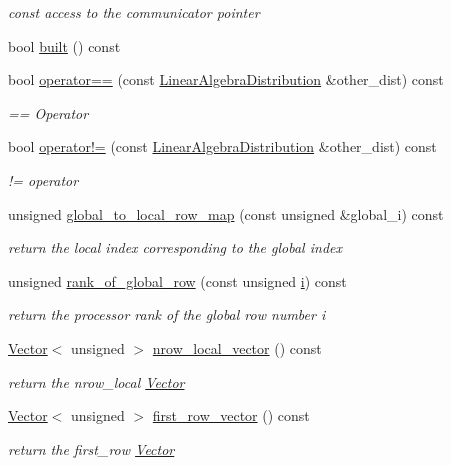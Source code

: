 \begin{DoxyCompactItemize}
\begin{DoxyCompactList}\small\item\em const access to the communicator pointer \end{DoxyCompactList}\item 
bool \hyperlink{classoomph_1_1LinearAlgebraDistribution_a92bfff97fd228b9c528922c39ab563b2}{built} () const
\item 
bool \hyperlink{classoomph_1_1LinearAlgebraDistribution_a2b38cf76c6636227fb3144812250a7e8}{operator==} (const \hyperlink{classoomph_1_1LinearAlgebraDistribution}{Linear\+Algebra\+Distribution} \&other\+\_\+dist) const
\begin{DoxyCompactList}\small\item\em == Operator \end{DoxyCompactList}\item 
bool \hyperlink{classoomph_1_1LinearAlgebraDistribution_a40765b8fee6c000dbe5b94c38d76466e}{operator!=} (const \hyperlink{classoomph_1_1LinearAlgebraDistribution}{Linear\+Algebra\+Distribution} \&other\+\_\+dist) const
\begin{DoxyCompactList}\small\item\em != operator \end{DoxyCompactList}\item 
unsigned \hyperlink{classoomph_1_1LinearAlgebraDistribution_a899aa7ebf7b1aab1fae2fccfc5b3b43d}{global\+\_\+to\+\_\+local\+\_\+row\+\_\+map} (const unsigned \&global\+\_\+i) const
\begin{DoxyCompactList}\small\item\em return the local index corresponding to the global index \end{DoxyCompactList}\item 
unsigned \hyperlink{classoomph_1_1LinearAlgebraDistribution_acd5ffc5ff4b91a8e63677f9677cd0039}{rank\+\_\+of\+\_\+global\+\_\+row} (const unsigned \hyperlink{cfortran_8h_adb50e893b86b3e55e751a42eab3cba82}{i}) const
\begin{DoxyCompactList}\small\item\em return the processor rank of the global row number i \end{DoxyCompactList}\item 
\hyperlink{classoomph_1_1Vector}{Vector}$<$ unsigned $>$ \hyperlink{classoomph_1_1LinearAlgebraDistribution_a8d8bc283c4b70295bafe1f5bacebbe64}{nrow\+\_\+local\+\_\+vector} () const
\begin{DoxyCompactList}\small\item\em return the nrow\+\_\+local \hyperlink{classoomph_1_1Vector}{Vector} \end{DoxyCompactList}\item 
\hyperlink{classoomph_1_1Vector}{Vector}$<$ unsigned $>$ \hyperlink{classoomph_1_1LinearAlgebraDistribution_a0d5b29bcfad98c3aa803dd8dab873ca9}{first\+\_\+row\+\_\+vector} () const
\begin{DoxyCompactList}\small\item\em return the first\+\_\+row \hyperlink{classoomph_1_1Vector}{Vector} \end{DoxyCompactList}\end{DoxyCompactItemize}
